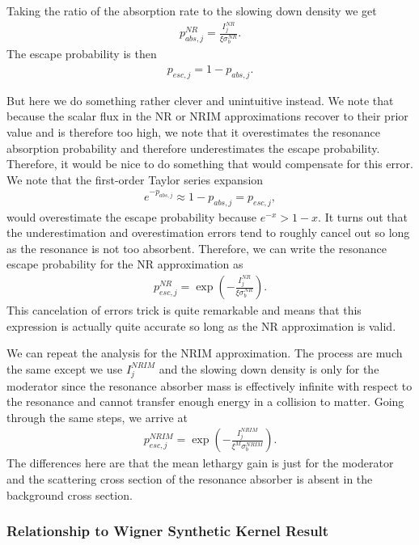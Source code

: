 Taking the ratio of the absorption rate to the slowing down density we get
\begin{align}
  p_{abs,j}^{NR} = \frac{ I_j^{NR} }{ \xi \sigma_b^{NR} }.
\end{align}
The escape probability is then
\begin{align}
  p_{esc,j} = 1 - p_{abs,j} .
\end{align}

But here we do something rather clever and unintuitive instead. We note that because the scalar flux in the NR or NRIM approximations recover to their prior value and is therefore too high, we note that it overestimates the resonance absorption probability and therefore underestimates the escape probability. Therefore, it would be nice to do something that would compensate for this error. We note that the first-order Taylor series expansion
\begin{align}
  e^{-p_{abs,j}} \approx 1 - p_{abs,j} = p_{esc,j} ,
\end{align}
would overestimate the escape probability because $e^{-x} > 1 - x$. It turns out that the underestimation and overestimation errors tend to roughly cancel out so long as the resonance is not too absorbent. Therefore, we can write the resonance escape probability for the NR approximation as
\begin{align}
  p_{esc,j}^{NR} = \exp\left( -\frac{ I_j^{NR} }{ \xi \sigma_b^{NR} } \right) . \label{Eq:thermalization_resonanceEscapeProbability_NR}
\end{align}
This cancelation of errors trick is quite remarkable and means that this expression is actually quite accurate so long as the NR approximation is valid. 

We can repeat the analysis for the NRIM approximation. The process are much the same except we use $I_j^{NRIM}$ and the slowing down density is only for the moderator since the resonance absorber mass is effectively infinite with respect to the resonance and cannot transfer enough energy in a collision to matter. Going through the same steps, we arrive at
\begin{align}
  p_{esc,j}^{NRIM} = \exp\left( -\frac{ I_j^{NRIM} }{ \xi^M \sigma_b^{NRIM} } \right) .
\end{align}
The differences here are that the mean lethargy gain is just for the moderator and the scattering cross section of the resonance absorber is absent in the background cross section.

\subsubsection{Relationship to Wigner Synthetic Kernel Result}

